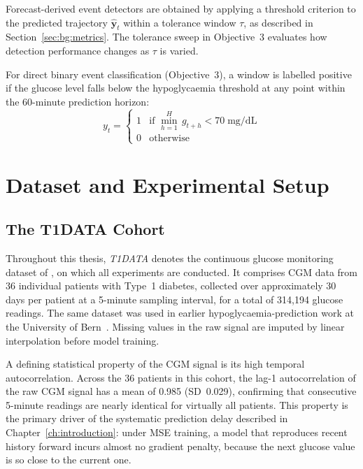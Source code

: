 Forecast-derived event detectors are obtained by applying a threshold criterion to the predicted trajectory $\hat{\mathbf{y}}_t$ within a tolerance window $\tau$, as described in Section~\ref{sec:bg:metrics}. The tolerance sweep in Objective~3 evaluates how detection performance changes as $\tau$ is varied.

For direct binary event classification (Objective~3), a window is labelled positive if the glucose level falls below the hypoglycaemia threshold at any point within the 60-minute prediction horizon:
\begin{equation}
    y_t = \begin{cases} 1 & \text{if } \min_{h=1}^{H}\, g_{t+h} < 70\;\text{mg/dL} \\ 0 & \text{otherwise} \end{cases}
    \label{eq:eventlabel}
\end{equation}

\section{Dataset and Experimental Setup} \label{sec:method:setup}

\subsection{The T1DATA Cohort} \label{sec:method:setup:cgm}

Throughout this thesis, \emph{T1DATA} denotes the continuous glucose monitoring dataset of \citet{garciatirado2023t1d}, on which all experiments are conducted. It comprises CGM data from 36 individual patients with Type~1 diabetes, collected over approximately 30 days per patient at a 5-minute sampling interval, for a total of 314{,}194 glucose readings. The same dataset was used in earlier hypoglycaemia-prediction work at the University of Bern~\citep{huni2023glucose}. Missing values in the raw signal are imputed by linear interpolation before model training.

A defining statistical property of the CGM signal is its high temporal autocorrelation. Across the 36 patients in this cohort, the lag-1 autocorrelation of the raw CGM signal has a mean of 0.985 (SD~0.029), confirming that consecutive 5-minute readings are nearly identical for virtually all patients. This property is the primary driver of the systematic prediction delay described in Chapter~\ref{ch:introduction}: under MSE training, a model that reproduces recent history forward incurs almost no gradient penalty, because the next glucose value is so close to the current one.

